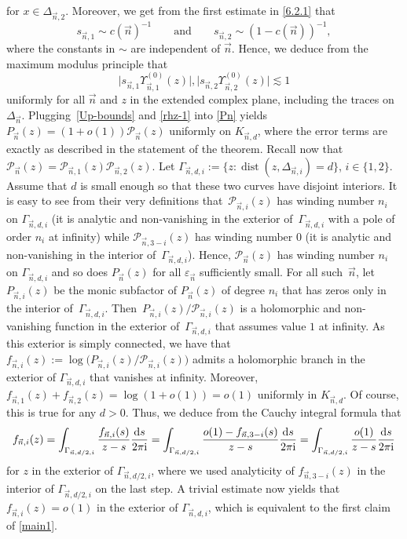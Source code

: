 \documentclass[pdftex]{sigma}
\numberwithin{equation}{section}
\newcommand{\dist}{\operatorname{dist}}
\newcommand{\n}{{\vec n}}
\newcommand{\ic}{\mathrm{i}}
\begin{document}
for $ x\in \Delta_{\n,2} $. Moreover, we get from the first estimate in \eqref{6.2.1} that
\begin{equation}
\label{est_sni}
s_{\n,1} \sim c(\n)^{-1} \qquad \text{and}\qquad  s_{\n,2} \sim (1-c(\n))^{-1},
\end{equation}
where the constants in $ \sim $ are independent of $ \n $. Hence, we deduce from the maximum modulus principle that
\begin{equation}
\label{Up-bounds}
\big|s_{\n,1}\Upsilon_{\n,1}^{(0)}(z)\big|, \big|s_{\n,2}\Upsilon_{\n,2}^{(0)}(z)\big| \lesssim 1
\end{equation}
uniformly for all $ \n $ and $ z $ in the extended complex plane, including the traces on $ \Delta_\n $. Plugging~\eqref{Up-bounds} and \eqref{rhz-1} into \eqref{Pn} yields
$
P_\n(z) = (1+o(1)) \mathcal P_\n(z)
$
uniformly on $ K_{\n,d} $, where the error terms are exactly as described in the statement of the theorem. Recall now that $ \mathcal P_\n(z) = \mathcal P_{\n,1}(z)\mathcal P_{\n,2}(z) $. Let $ \Gamma_{\n,d,i}:= \{ z : \dist(z,\Delta_{\n,i}) = d \} $, ${ i\in\{1,2\} }$. Assume that $ d $ is small enough so that these two curves have disjoint interiors. It is easy to see from their very definitions that~$ \mathcal P_{\n,i}(z) $ has winding number $ n_i $ on $ \Gamma_{\n,d,i} $ (it is analytic and non-vanishing in the exterior of~$ \Gamma_{\n,d,i} $ with a pole of order $ n_i $ at infinity) while $ \mathcal P_{\n,3-i}(z) $ has winding number $ 0 $ (it is analytic and non-vanishing in the interior of~$ \Gamma_{\n,d,i} $). Hence, $ \mathcal P_\n(z) $ has winding number $ n_i $ on $ \Gamma_{\n,d,i} $ and so does $ P_\n(z) $ for all $ \varepsilon_\n $ sufficiently small. For all such~$ \n $, let~$ P_{\n,i}(z) $ be the monic subfactor of $ P_\n(z) $ of degree $ n_i $ that has zeros only in the interior of~$ \Gamma_{\n,d,i} $. Then~${ P_{\n,i}(z)/\mathcal P_{\n,i}(z) }$ is a holomorphic and non-vanishing function in the exterior of~$ \Gamma_{\n,d,i} $ that assumes value $ 1 $ at infinity. As this exterior is simply connected, we have that
$
f_{\n,i}(z) := \log \bigl( P_{\n,i}(z)/\mathcal P_{\n,i}(z) \bigr)
$
admits a holomorphic branch in the exterior of $ \Gamma_{\n,d,i} $ that vanishes at infinity. Moreover, $ f_{\n,1}(z) + f_{\n,2}(z) = \log(1+o(1)) = o(1) $ uniformly in $ K_{\n,d} $. Of course, this is true for any $ d>0 $. Thus, we deduce from the Cauchy integral formula that
\[
f_{\n,i}(z) = \int_{\Gamma_{\n,d/2,i}} \frac{f_{\n,i}(s)}{z-s}\frac{{\rm d}s}{2\pi\ic} = \int_{\Gamma_{\n,d/2,i}} \frac{o(1) - f_{\n,3-i}(s)}{z-s}\frac{{\rm d}s}{2\pi\ic} = \int_{\Gamma_{\n,d/2,i}} \frac{o(1)}{z-s}\frac{{\rm d}s}{2\pi\ic}
\]
for $ z $ in the exterior of $ \Gamma_{\n,d/2,i} $, where we used analyticity of $ f_{\n,3-i}(z) $ in the interior of $ \Gamma_{\n,d/2,i} $ on the last step. A trivial estimate now yields that $ f_{\n,i}(z) = o(1) $ in the exterior of $ \Gamma_{\n,d,i} $, which is equivalent to the first claim of \eqref{main1}.
\end{document}
